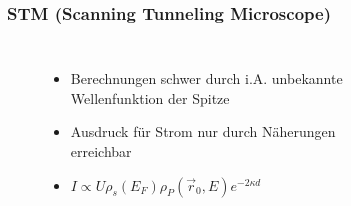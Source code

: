 \documentclass{beamer}
\begin{document}
\begin{frame}
\frametitle{STM (Scanning Tunneling Microscope)}
% 		
	 \begin{columns}
\begin{figure}[H]
\begin{center}
\begin{itemize}\setlength{\itemsep}{+15pt}
		  \item Berechnungen schwer durch i.A. unbekannte Wellenfunktion der Spitze
		  \item Ausdruck für Strom nur durch Näherungen erreichbar
		  \item $I\propto U \rho_{s}(E_F) \rho_P(\vec{r}_0, E)e^{-2\kappa d}$
		\end{itemize}
\end{center}
\end{figure}

\begin{figure}[H]
\begin{center}

\end{center}
\end{figure}
\end{columns}
\end{frame}

\end{document}
